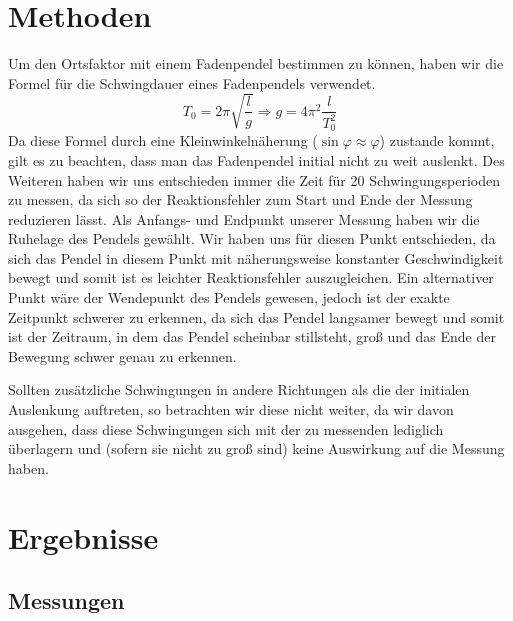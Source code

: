 \documentclass[
	a4paper,
	12pt,
	pagesize,
	ngerman
]{scrartcl}
\begin{document}
	\section{Methoden}
	Um den Ortsfaktor mit einem Fadenpendel bestimmen zu können, haben wir die Formel für die Schwingdauer eines Fadenpendels verwendet.
		\begin{equation}\label{eq:Ortsfaktor}
			T_0 = 2\pi \sqrt{\frac{l}{g}}
			\Rightarrow{} g = 4\pi{}^2\frac{l}{T_0^2}
		\end{equation}
	Da diese Formel durch eine Kleinwinkelnäherung (\(\sin{\varphi} \approx \varphi \)) zustande kommt, gilt es zu beachten, dass man das Fadenpendel initial nicht zu weit auslenkt. %
	Des Weiteren haben wir uns entschieden immer die Zeit für 20 Schwingungsperioden zu messen, da sich so der Reaktionsfehler zum Start und Ende der Messung reduzieren lässt.
	Als Anfangs- und Endpunkt unserer Messung haben wir die Ruhelage des Pendels gewählt. Wir haben uns für diesen Punkt entschieden, da sich das Pendel in diesem Punkt mit näherungsweise konstanter Geschwindigkeit bewegt und somit ist es leichter Reaktionsfehler auszugleichen. Ein alternativer Punkt wäre der Wendepunkt des Pendels gewesen, jedoch ist der exakte Zeitpunkt schwerer zu erkennen, da sich das Pendel langsamer bewegt und somit ist der Zeitraum, in dem das Pendel scheinbar stillsteht, groß und das Ende der Bewegung schwer genau zu erkennen.\par %
	Sollten zusätzliche Schwingungen in andere Richtungen als die der initialen Auslenkung auftreten, so betrachten wir diese nicht weiter, da wir davon ausgehen, dass diese Schwingungen sich mit der zu messenden lediglich überlagern und (sofern sie nicht zu groß sind) keine Auswirkung auf die Messung haben.  
	\newpage
	\section{Ergebnisse}
	\subsection{Messungen}
\end{document}
